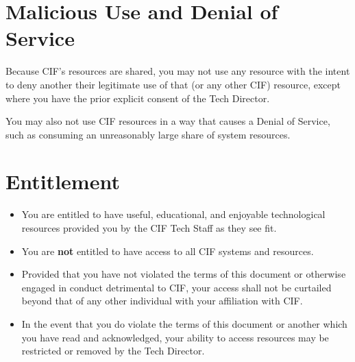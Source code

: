 \documentclass[12pt]{article}
\begin{document}
\section{Malicious Use and Denial of Service} %

Because CIF's resources are shared, you may not use any resource with the intent to deny another their legitimate use of that (or any other CIF) resource, except where you have the prior explicit consent of the Tech Director.

You may also not use CIF resources in a way that causes a Denial of Service, such as consuming an unreasonably large share of system resources.


\section{Entitlement} %

\begin{itemize}
	\item You are entitled to have useful, educational, and enjoyable technological resources provided you by the CIF Tech Staff as they see fit.
	\item You are \textbf{not} entitled to have access to all CIF systems and resources.
	\item Provided that you have not violated the terms of this document or otherwise engaged in conduct detrimental to CIF, your access shall not be curtailed beyond that of any other individual with your affiliation with CIF.
	\item In the event that you do violate the terms of this document or another which you have read and acknowledged, your ability to access resources may be restricted or removed by the Tech Director.
\end{itemize}

\end{document}
